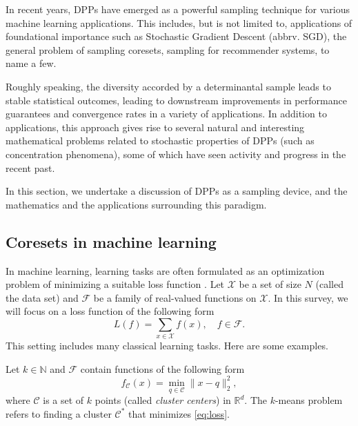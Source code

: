 In recent years, DPPs have emerged as a powerful sampling technique for various machine learning applications. This includes, but is not limited to, applications of foundational importance such as Stochastic Gradient Descent (abbrv. SGD), the general problem of sampling coresets, sampling for recommender systems, to name a few. 

Roughly speaking, the diversity accorded by a determinantal sample leads to stable statistical outcomes, leading to downstream improvements in performance guarantees and convergence rates in a variety of applications. In addition to applications, this approach gives rise to several natural and interesting mathematical problems related to stochastic properties of DPPs (such as concentration phenomena), some of which have seen activity and progress in the recent past.

In this section, we undertake a discussion of DPPs as a sampling device, and the mathematics and the applications surrounding this paradigm.


\subsection{Coresets in machine learning}


In machine learning, learning tasks are often formulated as an optimization problem of minimizing a suitable loss function \cite{Shalev-Shwartz_Ben-David_2014}. Let $\mathcal X$ be a set of size $N$ (called the data set) and $\mathcal F$ be a family of real-valued functions on $\mathcal X$. In this survey, we will focus on a loss function of the following form
\begin{equation} \label{eq:loss}
    L(f) = \sum_{x\in \mathcal X} f(x), \quad f \in \mathcal F.
\end{equation}
This setting includes many classical learning tasks. Here are some examples.

\begin{example}[$k$-means] \label{eg:k-mean}
    Let $k\in \mathbb N$ and $\mathcal F$ contain functions of the following form
    \[ f_{\mathcal C}(x) = \min_{q\in \mathcal C} \|x-q\|_2^2,\]
    where $\mathcal C$ is a set of $k$ points (called \textit{cluster centers}) in $\mathbb R^d$. The $k$-means problem refers to finding a cluster $\mathcal C^*$ that minimizes \eqref{eq:loss}.
\end{example}

